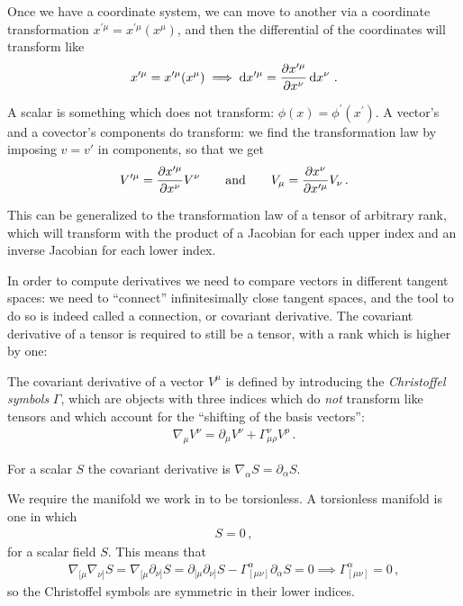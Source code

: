 \documentclass[main.tex]{subfiles}
\begin{document}
Once we have a coordinate system, we can move to another via a coordinate transformation \(x^{\prime \mu } = x^{\prime \mu } (x^{\mu }) \), and then the differential of the coordinates will transform like
%
\begin{align}
x^{\prime \mu } = x^{\prime \mu } \qty(x^{\mu })
\implies 
\dd{x^{\prime \mu }} = \pdv{x^{\prime \mu }}{x^{\nu }} \dd{x^{\nu }}
\,.
\end{align}

A scalar is something which does not transform: \(\phi (x) = \phi^{\prime } (x^{\prime })\).
A vector's and a covector's components do transform: we find the transformation law by imposing \(v = v'\) in components, so that we get 
%
\begin{align}
V^{\prime \mu } = \pdv{x^{\prime \mu }}{x^{\nu }} V^{\nu }
\qquad \text{and} \qquad
V_{\mu } = \pdv{x^{\nu }}{x^{\prime \mu }}V_{\nu }
\,.
\end{align}

This can be generalized to the transformation law of a tensor of arbitrary rank, which will transform with the product of a Jacobian for each upper index and an inverse Jacobian for each lower index.

In order to compute derivatives we need to compare vectors in different tangent spaces: we need to ``connect'' infinitesimally close tangent spaces, and the tool to do so is indeed called a connection, or covariant derivative. 
The covariant derivative of a tensor is required to still be a tensor, with a rank which is higher by one: 

The covariant derivative of a vector \(V^{\mu }\) is defined by introducing the \emph{Christoffel symbols} \(\Gamma \), which are objects with three indices which do \emph{not} transform like tensors and which account for the ``shifting of the basis vectors'':
%
\begin{align}
\nabla_{\mu } V^{\nu } = \partial_{\mu } V^{\nu } + \Gamma^{\nu }_{\mu \rho } V^{\rho }
\,.
\end{align}

For a scalar \(S\) the covariant derivative is \(\nabla_{\alpha } S = \partial_{\alpha } S\). 

We require the manifold we work in to be torsionless.
A torsionless manifold is one in which 
%
\begin{align}
[\nabla_{\mu }, \nabla_{\nu }] S = 0
\,,
\end{align}
%
for a scalar field \(S\). 
This means that 
%
\begin{align}
\nabla_{[\mu  } \nabla_{\nu ]} S = \nabla_{[\mu  } \partial_{\nu ]} S = \partial_{[\mu } \partial_{\nu ]} S - \Gamma^{\alpha }_{[\mu \nu ]} \partial_{\alpha } S = 0
\implies \Gamma^{\alpha }_{[\mu \nu ]} = 0
\,,
\end{align}
%
so the Christoffel symbols are symmetric in their lower indices.  
\end{document}
